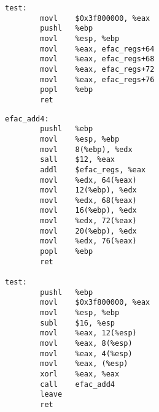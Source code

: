 \begin{lstlisting}[float=ht,caption={x86 inlined (gcc -S -m32 -O3)},label={lst:inline32}]
test:
        movl    $0x3f800000, %eax
        pushl   %ebp
        movl    %esp, %ebp
        movl    %eax, efac_regs+64
        movl    %eax, efac_regs+68
        movl    %eax, efac_regs+72
        movl    %eax, efac_regs+76
        popl    %ebp
        ret
\end{lstlisting}

\begin{lstlisting}[float=ht,caption={x86 not inlined (gcc -S -m32 -O3 -fno-inline)},label={lst:noinline32}]
efac_add4:
        pushl   %ebp
        movl    %esp, %ebp
        movl    8(%ebp), %edx
        sall    $12, %eax
        addl    $efac_regs, %eax
        movl    %edx, 64(%eax)
        movl    12(%ebp), %edx
        movl    %edx, 68(%eax)
        movl    16(%ebp), %edx
        movl    %edx, 72(%eax)
        movl    20(%ebp), %edx
        movl    %edx, 76(%eax)
        popl    %ebp
        ret

test:
        pushl   %ebp
        movl    $0x3f800000, %eax
        movl    %esp, %ebp
        subl    $16, %esp
        movl    %eax, 12(%esp)
        movl    %eax, 8(%esp)
        movl    %eax, 4(%esp)
        movl    %eax, (%esp)
        xorl    %eax, %eax
        call    efac_add4
        leave
        ret
\end{lstlisting}
